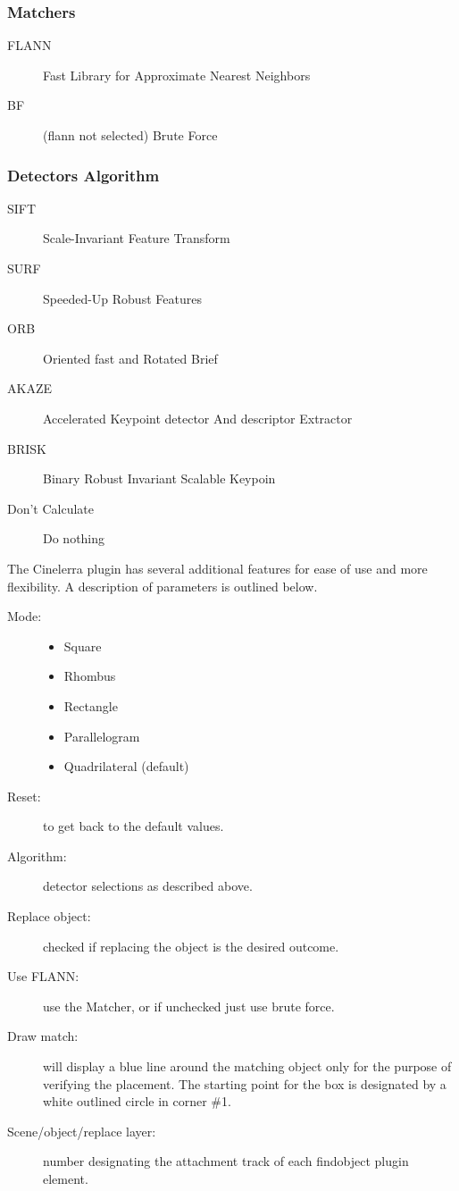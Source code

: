 \subsubsection*{Matchers}%
\label{ssub:matchers}

\begin{description}
    \item[FLANN] Fast Library for Approximate Nearest Neighbors
    \item[BF] (flann not selected) Brute Force
\end{description}

\subsubsection*{Detectors Algorithm}%
\label{ssub:detectors_algorithm}

\begin{description}
    \item[SIFT] Scale-Invariant Feature Transform
    \item[SURF] Speeded-Up Robust Features
    \item[ORB] Oriented fast and Rotated Brief
    \item[AKAZE] Accelerated Keypoint detector And descriptor Extractor
    \item[BRISK] Binary Robust Invariant Scalable Keypoin
    \item [Don’t Calculate] Do nothing
\end{description}

The Cinelerra plugin has several additional features for ease of use and more flexibility. A description of parameters is outlined below.

\begin{description}
    \item[Mode:]
    \begin{itemize}[noitemsep]
        \item Square
        \item Rhombus
        \item Rectangle
        \item Parallelogram
        \item Quadrilateral (default)
    \end{itemize}
    \item[Reset:] to get back to the default values.
    \item[Algorithm:] detector selections as described above.
    \item[Replace object:] checked if replacing the object is the desired outcome.
    \item[Use FLANN:] use the Matcher, or if unchecked just use brute force.
    \item[Draw match:] will display a blue line around the matching object only for the purpose of verifying the placement. The starting point for the box is designated by a white outlined circle in corner \#1.
    \item[Scene/object/replace layer:] number designating the attachment track of each findobject plugin element.
\end{description}

